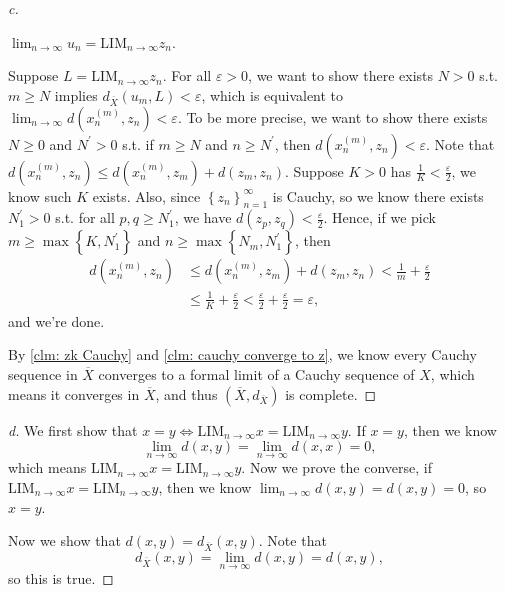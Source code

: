 \begin{proof}[c]
  \begin{claim} \label{clm: cauchy converge to z}
    \(\lim_{n \to \infty} u_n = \mathrm{LIM}_{n \to \infty } z_n\). 
  \end{claim}
  \begin{explanation}
    Suppose \(L = \mathrm{LIM}_{n \to \infty } z_n \). For all \(\varepsilon > 0\), we want to show there exists \(N > 0\) s.t. \(m \ge N\) implies \(d_{\overline{X} }\left( u_m, L \right) < \varepsilon  \), which is equivalent to \(\lim_{n \to \infty} d\left( x_n^{(m)}, z_n \right) < \varepsilon   \). To be more precise, we want to show there exists \(N \ge 0\) and \(N^{\prime} > 0\) s.t. if \(m \ge N\) and \(n \ge N^{\prime} \), then \(d\left( x_n^{(m)}, z_n \right) < \varepsilon  \). Note that \(d\left( x_n^{(m)}, z_n \right) \le d\left( x_n^{(m)}, z_m \right) + d(z_m, z_n)  \). Suppose \(K > 0\) has \(\frac{1}{K} < \frac{\varepsilon}{2}\), we know such \(K\) exists. Also, since \(\left\{ z_n \right\}_{n=1}^{\infty}  \) is Cauchy, so we know there exists \(N_1^{\prime} > 0\) s.t. for all \(p, q \ge N_1^{\prime} \), we have \(d\left( z_p, z_q \right) < \frac{\varepsilon}{2} \). Hence, if we pick \(m \ge \max \left\{ K, N_1^{\prime}  \right\} \) and \(n \ge \max \left\{ N_m, N_1^{\prime}  \right\} \), then 
    \begin{align*}
      d\left( x_n^{(m)}, z_n \right) &\le d\left( x_n^{(m)}, z_m \right) + d(z_m, z_n) < \frac{1}{m} + \frac{\varepsilon}{2} \\
      &\le \frac{1}{K} + \frac{\varepsilon}{2} < \frac{\varepsilon}{2} + \frac{\varepsilon}{2} = \varepsilon ,
    \end{align*}
    and we're done.           
  \end{explanation}
  By \autoref{clm: zk Cauchy} and \autoref{clm: cauchy converge to z}, we know every Cauchy sequence in \(\overline{X} \) converges to a formal limit of a Cauchy sequence of \(X\), which means it converges in \(\overline{X} \), and thus \(\left( \overline{X}, d_{\overline{X} }  \right) \) is complete.
\end{proof}

\begin{proof}[d]
  We first show that \(x = y \iff \mathrm{LIM}_{n \to \infty } x = \mathrm{LIM}_{n \to \infty } y  \). If \(x = y\), then we know 
  \[
    \lim_{n \to \infty} d(x, y) = \lim_{n \to \infty} d(x, x) = 0,  
  \]  which means \(\mathrm{LIM}_{n \to  \infty } x = \mathrm{LIM}_{n \to \infty }y  \). Now we prove the converse, if \(\mathrm{LIM}_{n \to \infty } x = \mathrm{LIM}_{n \to \infty } y  \), then we know \(\lim_{n \to \infty} d(x, y) = d(x, y) = 0 \), so \(x = y\). 
  
  Now we show that \(d(x, y) = d_{\overline{X} }(x, y)\). Note that 
  \[
    d_{\overline{X} }(x, y) = \lim_{n \to \infty} d(x, y) = d(x, y), 
  \] so this is true.
\end{proof}

